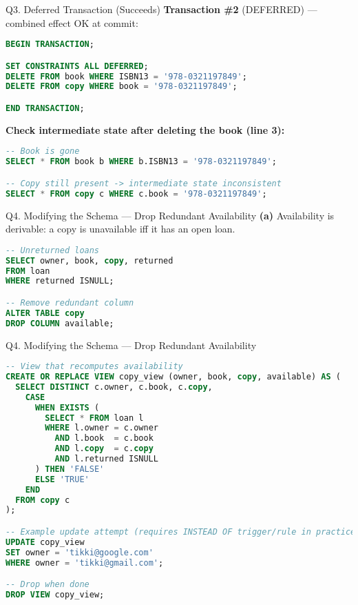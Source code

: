 \documentclass{beamer}
\begin{document}
\begin{frame}[fragile]{Q3. Deferred Transaction (Succeeds)}
\textbf{Transaction \#2} (DEFERRED) — combined effect OK at commit:
\begin{lstlisting}[language=SQL]
BEGIN TRANSACTION;

SET CONSTRAINTS ALL DEFERRED;
DELETE FROM book WHERE ISBN13 = '978-0321197849';
DELETE FROM copy WHERE book = '978-0321197849';

END TRANSACTION;
\end{lstlisting}

\textbf{Check intermediate state after deleting the book (line 3):}
\begin{lstlisting}[language=SQL]
-- Book is gone
SELECT * FROM book b WHERE b.ISBN13 = '978-0321197849';

-- Copy still present -> intermediate state inconsistent
SELECT * FROM copy c WHERE c.book = '978-0321197849';
\end{lstlisting}
\end{frame}

\begin{frame}[fragile]{Q4. Modifying the Schema — Drop Redundant Availability}
\textbf{(a)} Availability is derivable: a copy is unavailable iff it has an open loan.
\begin{lstlisting}[language=SQL]
-- Unreturned loans
SELECT owner, book, copy, returned
FROM loan
WHERE returned ISNULL;

-- Remove redundant column
ALTER TABLE copy
DROP COLUMN available;
\end{lstlisting}
\end{frame}

\begin{frame}[fragile]{Q4. Modifying the Schema — Drop Redundant Availability}
\begin{lstlisting}[language=SQL]
-- View that recomputes availability
CREATE OR REPLACE VIEW copy_view (owner, book, copy, available) AS (
  SELECT DISTINCT c.owner, c.book, c.copy,
    CASE
      WHEN EXISTS (
        SELECT * FROM loan l
        WHERE l.owner = c.owner
          AND l.book  = c.book
          AND l.copy  = c.copy
          AND l.returned ISNULL
      ) THEN 'FALSE'
      ELSE 'TRUE'
    END
  FROM copy c
);

-- Example update attempt (requires INSTEAD OF trigger/rule in practice)
UPDATE copy_view
SET owner = 'tikki@google.com'
WHERE owner = 'tikki@gmail.com';

-- Drop when done
DROP VIEW copy_view;
\end{lstlisting}
\end{frame}
\end{document}
